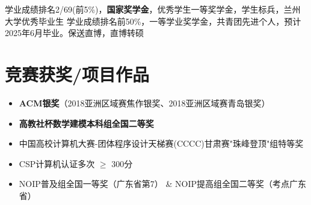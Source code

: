 \documentclass{resume}
\begin{document}
学业成绩排名2/69(前5\%)，\textbf{国家奖学金}，优秀学生一等奖学金，学生标兵，兰州大学优秀毕业生
学业成绩排名前50\%，一等学业奖学金，共青团先进个人，预计2025年6月毕业。保送直博，直博转硕




\section{竞赛获奖/项目作品}
\begin{itemize}[parsep=0.2ex]
  \item \textbf{ACM银奖}（2018亚洲区域赛焦作银奖、2018亚洲区域赛青岛银奖）
  \item \textbf{高教社杯数学建模本科组全国二等奖}
  \item 中国高校计算机大赛-团体程序设计天梯赛(CCCC)甘肃赛"珠峰登顶"组特等奖
  \item CSP计算机认证多次 $\geq$ 300分
  \item NOIP普及组全国一等奖（广东省第7） \& NOIP提高组全国二等奖（考点广东省）
  
\end{itemize}


\end{document}
